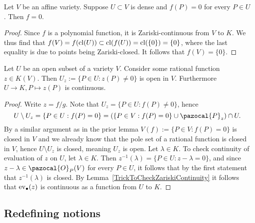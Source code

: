     \begin{lemma}\label{VanishingOnEveryPointInADenseSubsetIsTheSameAsBeingZero}
        Let $V$ be an affine variety. Suppose $U\subset V$ is dense and $f(P)=0$ for every $P\in U$. Then $f=0$.
    \end{lemma}
    \begin{proof}
        Since $f$ is a polynomial function, it is Zariski-continuous from $V$ to $K$. We thus find that $f(V)=f(\mathrm{cl}(U))\subset \mathrm{cl}(f(U))=\mathrm{cl}(\{0\})=\{0\}$, where the last equality is due to points being Zariski-closed. It follows that $f(V)=\{0\}$. 
    \end{proof}
    \begin{lemma}\label{ImportantOpenSetAndContinuityOfEvaluationOfRationalFunction}
        Let $U$ be an open subset of a variety $V$. Consider some rational function $z\in K(V)$. Then $U_z:= \{P\in U : z(P)\neq 0\}$ is open in $V$. Furthermore $U\rightarrow K, P\mapsto z(P)$ is continuous. 
    \end{lemma}
    \begin{proof}
        Write $z= f/g$. Note that $U_z = \{P\in U: f(P)\neq 0\}$, hence 
        $$U\setminus U_z =  \{P \in U : f(P)=0\} = (\{P\in V : f(P) = 0\} \cup \pazocal{P}_z)\cap U.$$ By a similar argument as in the prior lemma $V(f):= \{P\in V: f(P)=0\}$ is closed in $V$ and we already know that the pole set of a rational function is closed in $V$, hence $U\setminus U_z$ is closed, meaning $U_z$ is open. Let $\lambda \in K$. To check continuity of evaluation of $z$ on $U$, let $\lambda \in K$. Then $z^{-1}(\lambda) = \{P \in U : z-\lambda =0\}$, and since $z-\lambda \in \pazocal{O}_P(V)$ for every $P\in U$, it follows that by the first statement that $z^{-1}(\lambda)$ is closed. By Lemma~\ref{TrickToCheckZariskiContinuity} it follows that $\mathrm{ev}_\bullet(z)$ is continuous as a function from $U$ to $K$.
    \end{proof}
    \subsection{Redefining notions}
